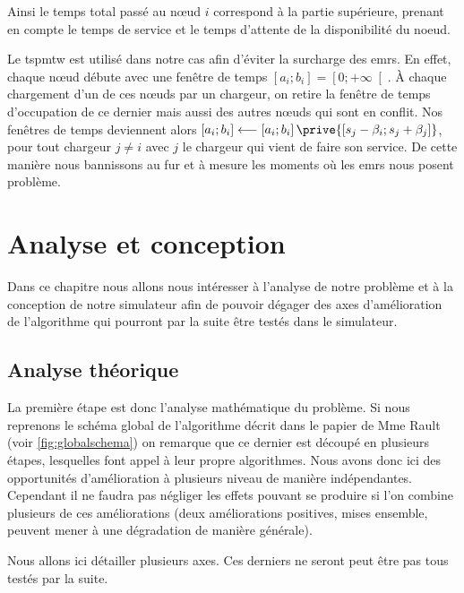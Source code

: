 \documentclass[final]{polytech/polytech}
\begin{document}
		Ainsi le temps total passé au n\oe ud $i$ correspond à la partie supérieure, prenant en compte le temps de service et le temps d'attente de la disponibilité du noeud.
		
		Le \gls{tspmtw} est utilisé dans notre cas afin d'éviter la surcharge des \glspl{emr}.
		En effet, chaque n\oe ud débute avec une fenêtre de temps $\left[ a_i;b_i\right] = \left[ 0; +\infty\right[$.
		À chaque chargement d'un de ces n\oe uds par un chargeur, on retire la fenêtre de temps d'occupation de ce dernier mais aussi des autres n\oe uds qui sont en conflit.
		Nos fenêtres de temps deviennent alors $\left[ a_i;b_i\right] \longleftarrow \left[ a_i;b_i\right] \prive{\left[ s_j - \beta_i;s_j+\beta_j\right]}$, pour tout chargeur $j\neq i$ avec $j$ le chargeur qui vient de faire son service.
		De cette manière nous bannissons au fur et à mesure les moments où les \glspl{emr} nous posent problème.

\chapter{Analyse et conception}
	Dans ce chapitre nous allons nous intéresser à l'analyse de notre problème et à la conception de notre simulateur afin de pouvoir dégager des axes d'amélioration de l'algorithme qui pourront par la suite être testés dans le simulateur.

	\section{Analyse théorique}
		La première étape est donc l'analyse mathématique du problème.
		Si nous reprenons le schéma global de l'algorithme décrit dans le papier de Mme Rault \cite{Rault:chargers} (voir \autoref{fig:globalschema}) on remarque que ce dernier est découpé en plusieurs étapes, lesquelles font appel à leur propre algorithmes.
		Nous avons donc ici des opportunités d'amélioration à plusieurs niveau de manière indépendantes.
		Cependant il ne faudra pas négliger les effets pouvant se produire si l'on combine plusieurs de ces améliorations (deux améliorations positives, mises ensemble, peuvent mener à une dégradation de manière générale).
		
		Nous allons ici détailler plusieurs axes.
		Ces derniers ne seront peut être pas tous testés par la suite.
		
\end{document}
